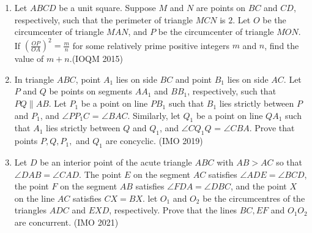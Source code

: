 \begin{enumerate}[label=\thesubsection.\arabic*,ref=\thesubsection.\theenumi]
    \item Let $ABCD$ be a unit square. Suppose $M$ and $N$ are points on $BC$ and $CD$, respectively, such that the perimeter of triangle $MCN$ is $2$. Let $O$ be the circumcenter of triangle $MAN$, and $P$ be the circumcenter of triangle $MON$. If $\left(\frac{OP}{OA}\right)^2 = \frac{m}{n}$ for some relatively prime positive integers $m$ and $n$, find the value of $m + n$.\hfill(IOQM 2015)
    
    \item In triangle  $ABC$, point $ A_1 $ lies on side $ BC $ and point $B_1$ lies on side $ AC $. Let  $P$ and $ Q $ be points on segments 
$AA_1$ and $BB_1 $, respectively, such that   $PQ \parallel AB$.
Let
 $P_1$ be a point on line  $PB_1$ such that $B_1$ lies strictly between 
$P$ and $P_1$, and $\angle PP_1C$ = $\angle BAC$. Similarly, let $Q_1$ 
be a point on line $QA_1$ such that $A_1$ lies strictly between $Q$ and 
$Q_1$, and $ \angle CQ_1Q$ = $\angle CBA $.
Prove that points $P, Q, P_1,$ and $Q_1$ are concyclic.
\hfill(IMO 2019)


\item Let $D$ be an interior point of the acute triangle $ABC$ with $AB > AC$ so that $\angle DAB = \angle CAD$. The point $E$ on the segment $AC$ satisfies $\angle ADE=\angle BCD$, the point $F$ on the segment $AB$ satisfies $\angle FDA=\angle DBC$, and the point $X$ on the line $AC$ satisfies $CX=BX$. let $O_{1}$ and $O_{2}$ be the circumcentres of the triangles $ADC$ and $EXD$, respectively. Prove that the lines $BC,EF$ and $O_{1} O_{2}$ are concurrent.
 \hfill(IMO 2021)


\end{enumerate}
